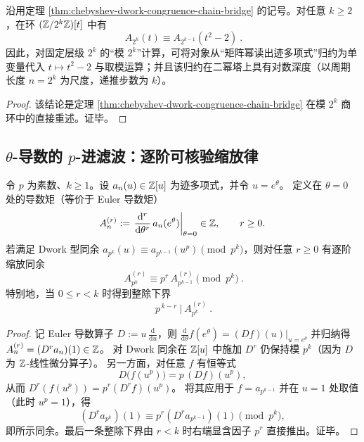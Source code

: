 \begin{corollary}\label{cor:chebyshev-dwork-matrixfree-bridge}
沿用定理 \ref{thm:chebyshev-dwork-congruence-chain-bridge} 的记号。对任意 \(k\ge 2\)，在环 \((\mathbb{Z}/2^k\mathbb{Z})[t]\) 中有
$$
\boxed{\ A_{2^k}(t)\equiv A_{2^{k-1}}(t^2-2)\ }.
$$
因此，对固定层级 \(2^k\) 的“模 \(2^k\)”计算，可将对象从“矩阵幂读出迹多项式”归约为单变量代入 \(t\mapsto t^2-2\) 与取模运算；并且该归约在二幂塔上具有对数深度（以周期长度 \(n=2^k\) 为尺度，递推步数为 \(k\)）。
\end{corollary}
\begin{proof}
该结论是定理 \ref{thm:chebyshev-dwork-congruence-chain-bridge} 在模 \(2^k\) 商环中的直接重述。证毕。
\end{proof}

\subsection{\texorpdfstring{$\theta$}{theta}-导数的 \texorpdfstring{$p$}{p}-进滤波：逐阶可核验缩放律}\label{subsec:theta-derivative-filter}

\begin{proposition}\label{prop:witt-theta-derivative-filter-bridge}
令 \(p\) 为素数、\(k\ge 1\)。设 \(a_n(u)\in\mathbb{Z}[u]\) 为迹多项式，并令 \(u=e^\theta\)。
定义在 \(\theta=0\) 处的导数矩（等价于 Euler 导数矩）
$$
A_{n}^{(r)}:=\left.\frac{\mathrm{d}^r}{\mathrm{d}\theta^r}\,a_n(e^\theta)\right|_{\theta=0}\in\mathbb{Z},\qquad r\ge 0.
$$
若满足 Dwork 型同余 \(a_{p^k}(u)\equiv a_{p^{k-1}}(u^p)\pmod{p^k}\)，则对任意 \(r\ge 0\) 有逐阶缩放同余
$$
\boxed{\ A_{p^k}^{(r)}\equiv p^r\,A_{p^{k-1}}^{(r)}\pmod{p^k}\ }.
$$
特别地，当 \(0\le r<k\) 时得到整除下界
$$
\boxed{\ p^{\,k-r}\ \big|\ A_{p^k}^{(r)}\ }.
$$
\end{proposition}
\begin{proof}
记 Euler 导数算子 \(D:=u\,\frac{\mathrm{d}}{\mathrm{d}u}\)，则
$
\frac{\mathrm{d}}{\mathrm{d}\theta}f(e^\theta)=(Df)(u)|_{u=e^\theta}
$
并归纳得
$
A_n^{(r)}=(D^r a_n)(1)\in\mathbb{Z}
$。
对 Dwork 同余在 \(\mathbb{Z}[u]\) 中施加 \(D^r\) 仍保持模 \(p^k\)（因为 \(D\) 为 \(\mathbb{Z}\)-线性微分算子）。
另一方面，对任意 \(f\) 有恒等式
$$
D\bigl(f(u^p)\bigr)=p\,(Df)(u^p),
$$
从而 \(D^r(f(u^p))=p^r(D^rf)(u^p)\)。
将其应用于 \(f=a_{p^{k-1}}\) 并在 \(u=1\) 处取值（此时 \(u^p=1\)），得
$$
(D^r a_{p^k})(1)\equiv p^r(D^r a_{p^{k-1}})(1)\pmod{p^k},
$$
即所示同余。最后一条整除下界由 \(r<k\) 时右端显含因子 \(p^r\) 直接推出。证毕。
\end{proof}

